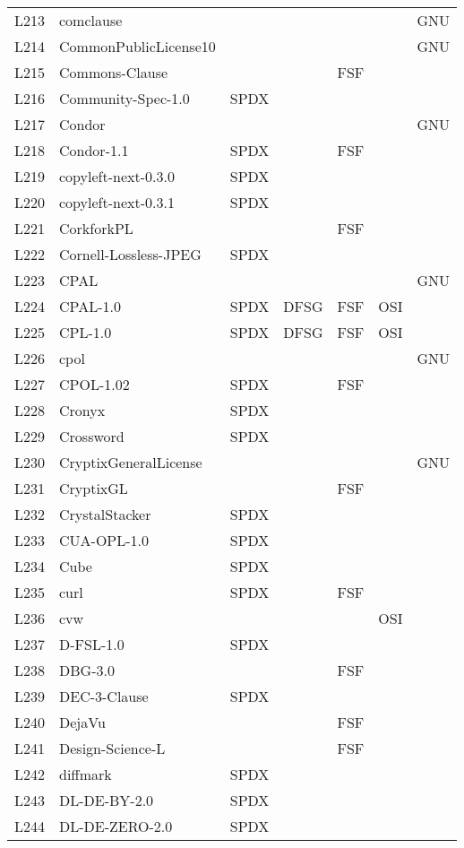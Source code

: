 \begin{longtable}[h]{m{2cm} | m{7cm} | c | c | c | c | c}
  L213 & comclause &  &  &  &  & GNU \\
  L214 & CommonPublicLicense10 &  &  &  &  & GNU \\
  L215 & Commons-Clause &  &  & FSF &  &  \\
  L216 & Community-Spec-1.0 & SPDX &  &  &  &  \\
  L217 & Condor &  &  &  &  & GNU \\
  L218 & Condor-1.1 & SPDX &  & FSF &  &  \\
  L219 & copyleft-next-0.3.0 & SPDX &  &  &  &  \\
  L220 & copyleft-next-0.3.1 & SPDX &  &  &  &  \\
  L221 & CorkforkPL &  &  & FSF &  &  \\
  L222 & Cornell-Lossless-JPEG & SPDX &  &  &  &  \\
  L223 & CPAL &  &  &  &  & GNU \\
  L224 & CPAL-1.0 & SPDX & DFSG & FSF & OSI &  \\
  L225 & CPL-1.0 & SPDX & DFSG & FSF & OSI &  \\
  L226 & cpol &  &  &  &  & GNU \\
  L227 & CPOL-1.02 & SPDX &  & FSF &  &  \\
  L228 & Cronyx & SPDX &  &  &  &  \\
  L229 & Crossword & SPDX &  &  &  &  \\
  L230 & CryptixGeneralLicense &  &  &  &  & GNU \\
  L231 & CryptixGL &  &  & FSF &  &  \\
  L232 & CrystalStacker & SPDX &  &  &  &  \\
  L233 & CUA-OPL-1.0 & SPDX &  &  &  &  \\
  L234 & Cube & SPDX &  &  &  &  \\
  L235 & curl & SPDX &  & FSF &  &  \\
  L236 & cvw &  &  &  & OSI &  \\
  L237 & D-FSL-1.0 & SPDX &  &  &  &  \\
  L238 & DBG-3.0 &  &  & FSF &  &  \\
  L239 & DEC-3-Clause & SPDX &  &  &  &  \\
  L240 & DejaVu &  &  & FSF &  &  \\
  L241 & Design-Science-L &  &  & FSF &  &  \\
  L242 & diffmark & SPDX &  &  &  &  \\
  L243 & DL-DE-BY-2.0 & SPDX &  &  &  &  \\
  L244 & DL-DE-ZERO-2.0 & SPDX &  &  &  &  \\

\end{longtable}
